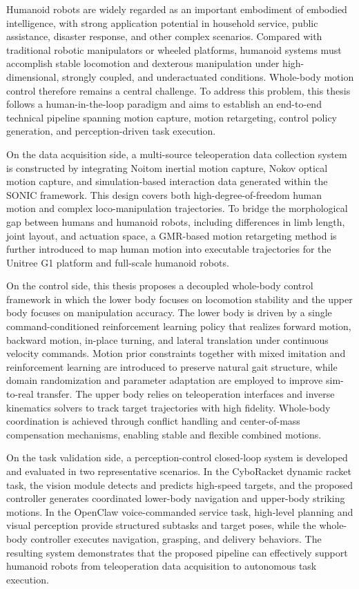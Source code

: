 \begin{abstract*}
  Humanoid robots are widely regarded as an important embodiment of embodied intelligence, with strong application potential in household service, public assistance, disaster response, and other complex scenarios. Compared with traditional robotic manipulators or wheeled platforms, humanoid systems must accomplish stable locomotion and dexterous manipulation under high-dimensional, strongly coupled, and underactuated conditions. Whole-body motion control therefore remains a central challenge. To address this problem, this thesis follows a human-in-the-loop paradigm and aims to establish an end-to-end technical pipeline spanning motion capture, motion retargeting, control policy generation, and perception-driven task execution.

  On the data acquisition side, a multi-source teleoperation data collection system is constructed by integrating Noitom inertial motion capture, Nokov optical motion capture, and simulation-based interaction data generated within the SONIC framework. This design covers both high-degree-of-freedom human motion and complex loco-manipulation trajectories. To bridge the morphological gap between humans and humanoid robots, including differences in limb length, joint layout, and actuation space, a GMR-based motion retargeting method is further introduced to map human motion into executable trajectories for the Unitree G1 platform and full-scale humanoid robots.

  On the control side, this thesis proposes a decoupled whole-body control framework in which the lower body focuses on locomotion stability and the upper body focuses on manipulation accuracy. The lower body is driven by a single command-conditioned reinforcement learning policy that realizes forward motion, backward motion, in-place turning, and lateral translation under continuous velocity commands. Motion prior constraints together with mixed imitation and reinforcement learning are introduced to preserve natural gait structure, while domain randomization and parameter adaptation are employed to improve sim-to-real transfer. The upper body relies on teleoperation interfaces and inverse kinematics solvers to track target trajectories with high fidelity. Whole-body coordination is achieved through conflict handling and center-of-mass compensation mechanisms, enabling stable and flexible combined motions.

  On the task validation side, a perception-control closed-loop system is developed and evaluated in two representative scenarios. In the CyboRacket dynamic racket task, the vision module detects and predicts high-speed targets, and the proposed controller generates coordinated lower-body navigation and upper-body striking motions. In the OpenClaw voice-commanded service task, high-level planning and visual perception provide structured subtasks and target poses, while the whole-body controller executes navigation, grasping, and delivery behaviors. The resulting system demonstrates that the proposed pipeline can effectively support humanoid robots from teleoperation data acquisition to autonomous task execution.
\end{abstract*}
